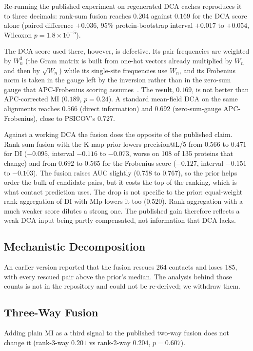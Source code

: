Re-running the published experiment on regenerated DCA caches reproduces it
to three decimals: rank-sum fusion reaches $0.204$ against $0.169$ for the
DCA score alone (paired difference $+0.036$, 95\% protein-bootstrap interval
$+0.017$ to $+0.054$, Wilcoxon $p = 1.8\times10^{-5}$).

The DCA score used there, however, is defective.  Its pair frequencies are
weighted by $W_n^3$ (the Gram matrix is built from one-hot vectors already
multiplied by $W_n$ and then by $\sqrt{W_n}$) while its single-site
frequencies use $W_n$, and its Frobenius norm is taken in the gauge left by the
inversion rather than in the zero-sum gauge that APC-Frobenius scoring
assumes~\cite{ekeberg2013}.  The result, $0.169$, is not better than
APC-corrected MI ($0.189$, $p = 0.24$).  A standard mean-field DCA on the same
alignments reaches $0.566$ (direct information) and $0.692$ (zero-sum-gauge
APC-Frobenius), close to PSICOV's $0.727$.

Against a working DCA the fusion does the opposite of the published claim.
Rank-sum fusion with the K-map prior lowers precision@L/5 from $0.566$ to
$0.471$ for DI ($-0.095$, interval $-0.116$ to $-0.073$, worse on 108 of 135
proteins that change) and from $0.692$ to $0.565$ for the Frobenius score
($-0.127$, interval $-0.151$ to $-0.103$).  The fusion raises AUC slightly
(0.758 to 0.767), so the prior helps order the bulk of candidate pairs, but it
costs the top of the ranking, which is what contact prediction uses.  The
drop is not specific to the prior: equal-weight rank aggregation of DI with
MIp lowers it too ($0.520$).  Rank aggregation with a much weaker score
dilutes a strong one.  The published gain therefore reflects a weak DCA input
being partly compensated, not information that DCA lacks.

\subsection{Mechanistic Decomposition}
An earlier version reported that the fusion rescues 264 contacts and loses
185, with every rescued pair above the prior's median.  The analysis behind
those counts is not in the repository and could not be re-derived; we
withdraw them.

\subsection{Three-Way Fusion}
Adding plain MI as a third signal to the published two-way fusion does not
change it (rank-3-way $0.201$ vs rank-2-way $0.204$, $p = 0.607$).
